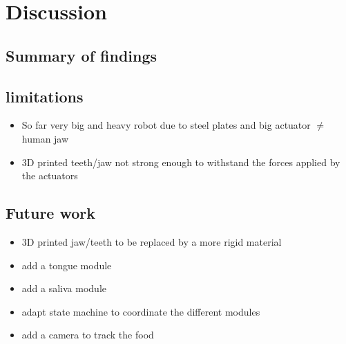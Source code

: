 \section{Discussion}
\subsection{Summary of findings}

\subsection{limitations}
\begin{itemize}
    \item So far very big and heavy robot due to steel plates and big actuator \(\neq\) human jaw
    \item 3D printed teeth/jaw not strong enough to withstand the forces applied by the actuators
\end{itemize}

\subsection{Future work}
\begin{itemize}
    \item 3D printed jaw/teeth to be replaced by a more rigid material
    \item add a tongue module
    \item add a saliva module
    \item adapt state machine to coordinate the different modules
    \item add a camera to track the food
\end{itemize}
